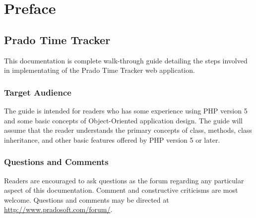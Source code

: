 \chapter*{Preface} \hypertarget{preface}{}
\section*{Prado Time Tracker}
This documentation is complete walk-through guide detailing the
steps involved in implementating of the Prado Time Tracker web application.

\subsection*{Target Audience}
The guide is intended for readers who has some experience
using PHP version 5 and some basic concepts of Object-Oriented application
design. The guide will assume that the reader understands the primary concepts
of class, methods, class inheritance, and other basic features offered by PHP
version 5 or later.
\subsection*{Questions and Comments}
Readers are encouraged to ask questions as the forum regarding any
particular aspect of this documentation. Comment and constructive criticisms
are most welcome. Questions and comments may be directed at
\href{http://www.pradosoft.com/forum/}{http://www.pradosoft.com/forum/}.


